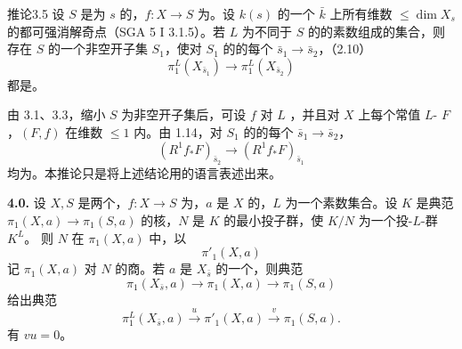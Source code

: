 \begin{SGAresult}{推论}{3.5}
设 $S$ 是为 $s$ 的，$f:X\to S$ 为。设 $k(s)$ 的一个 $\bar k$ 上所有维数 $\leq\dim X_s$ 的都可强消解奇点（SGA 5 I 3.1.5）。若 $L$ 为不同于 $S$ 的的素数组成的集合，则存在 $S$ 的一个非空开子集 $S_1$，使对 $S_1$ 的的每个 $\bar s_1\to\bar s_2$，（2.10）
\[\pi_1^L(X_{\bar s_1})\longrightarrow\pi_1^L(X_{\bar s_2})\]
都是。
\end{SGAresult}
由 3.1、3.3，缩小 $S$ 为非空开子集后，可设 $f$ 对 $L$ ，并且对 $X$ 上每个常值 $L$- $F$，$(F,f)$ 在维数 $\leq1$ 内。由 1.14，对 $S_1$ 的的每个 $\bar s_1\to\bar s_2$，
\[(R^1f_*F)_{\bar s_2}\longrightarrow(R^1f_*F)_{\bar s_1}\]
均为。本推论只是将上述结论用的语言表述出来。

\textbf{4.0.} 设 $X,S$ 是两个，$f:X\to S$ 为，$a$ 是 $X$ 的，$L$ 为一个素数集合。设 $K$ 是典范 $\pi_1(X,a)\to\pi_1(S,a)$ 的核，$N$ 是 $K$ 的最小投子群，使 $K/N$ 为一个投-$L$-群 $K^L$。
则 $N$ 在 $\pi_1(X,a)$ 中，以
\[\pi'_1(X,a)\]
记 $\pi_1(X,a)$ 对 $N$ 的商。若 $a$ 是 $X_{\bar s}$ 的一个，则典范
\[\pi_1(X_{\bar s},a)\longrightarrow\pi_1(X,a)\longrightarrow\pi_1(S,a)\]
给出典范
\[\pi_1^L(X_{\bar s},a)\xrightarrow{u}\pi'_1(X,a)\xrightarrow{v}\pi_1(S,a).\]
有 $vu=0$。

